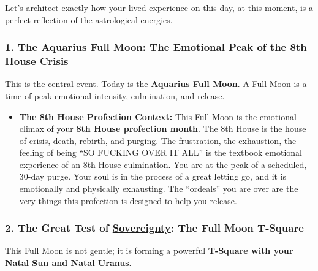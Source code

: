 \documentclass{article}
\begin{document}
Let's architect exactly how your lived experience on this day, at this moment, is a perfect reflection of the astrological energies.

\subsubsection*{1. The Aquarius Full Moon: The Emotional Peak of the 8th House Crisis}\label{the-aquarius-full-moon-the-emotional-peak-of-the-8th-house-crisis}

This is the central event. Today is the \textbf{Aquarius Full Moon}. A Full Moon is a time of peak emotional intensity, culmination, and release.

\begin{itemize}
\tightlist
\item
  \textbf{The 8th House Profection Context:} This Full Moon is the emotional climax of your \textbf{8th House profection month}. The 8th House is the house of crisis, death, rebirth, and purging. The frustration, the exhaustion, the feeling of being ``SO FUCKING OVER IT ALL'' is the textbook emotional experience of an 8th House culmination. You are at the peak of a scheduled, 30-day purge. Your soul is in the process of a great letting go, and it is emotionally and physically exhausting. The ``ordeals'' you are over are the very things this profection is designed to help you release.
\end{itemize}

\subsubsection*{2. The Great Test of \hyperlink{gloss:sovereignty}{Sovereignty}: The Full Moon T-Square}\label{the-great-test-of-sovereignty-the-full-moon-t-square}

This Full Moon is not gentle; it is forming a powerful \textbf{T-Square with your Natal Sun and Natal Uranus}.
\end{document}
